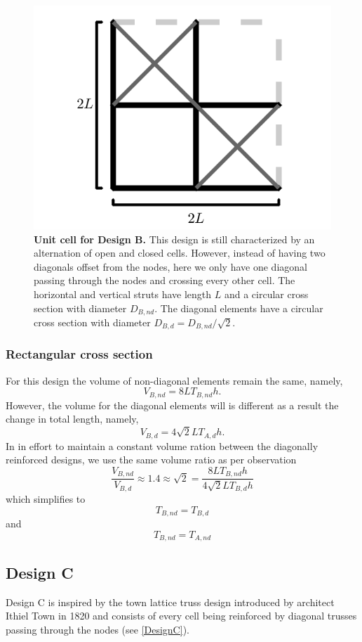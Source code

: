 \documentclass[10pt,twoside]{fernandes_supp}
\begin{document}
\begin{figure}[H]
    \centering
    \includegraphics[width=0.4\linewidth]{SFig3.png}
    \caption{{\bf Unit cell for Design B.} This design is still characterized by an alternation of open and closed cells. However, instead of having two  diagonals offset from the nodes, here we only have one diagonal passing through the nodes and crossing every other cell. The horizontal and vertical struts have length $L$ and a circular cross section with diameter $D_{B,nd}$. The diagonal elements have a circular cross section  with diameter $D_{B,d}={D_{B,nd}}/{\sqrt{2}}$.}
    \label{DesignB}
\end{figure}

\subsubsection{Rectangular cross section}
For this design the volume of non-diagonal elements remain the same, namely,
\begin{equation}
		V_{B,nd}=8LT_{B,nd}h.
\end{equation}
However, the volume for the diagonal elements will is different as a result the change in total length, namely,
\begin{equation}
		V_{B,d}=4\sqrt{2}LT_{A,d}h.
\end{equation}
In in effort to maintain a constant volume ration between the diagonally reinforced designs, we use the same volume ratio as per observation
\begin{equation}
		\frac{V_{B,nd}}{V_{B,d}}\approx 1.4\approx\sqrt{2}=\frac{8LT_{B,nd}h}{4\sqrt{2}LT_{B,d}h}
\end{equation}
which simplifies to
\begin{equation}
	T_{B,nd}=T_{B,d}
\end{equation}
and
\begin{equation}
	T_{B,nd}=T_{A,nd}
\end{equation}

\subsection{Design C}
Design C is inspired by the town lattice truss design introduced by architect Ithiel Town in 1820 \citep{waddell1916} and consists of every cell being reinforced by diagonal trusses passing through the nodes (see \cref{DesignC}).
\end{document}
